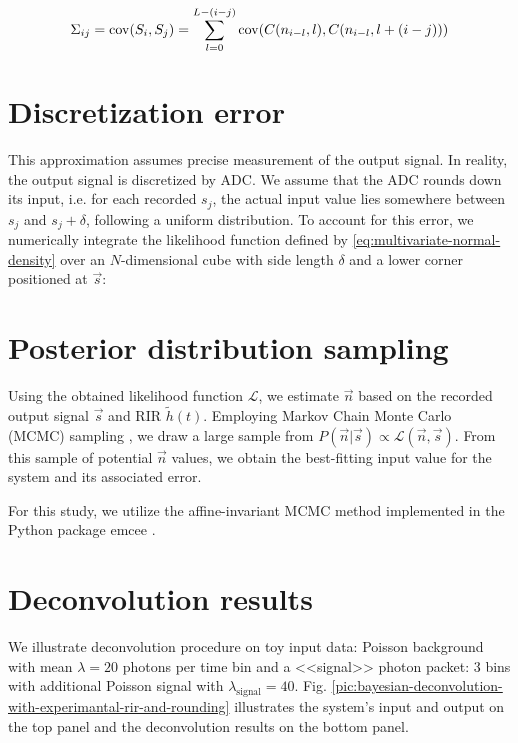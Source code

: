 \begin{equation}
	\Sigma_{ij} = \mathrm{cov}(S_i, S_j) = \sum_{l=0}^{L - (i-j)} \mathrm{cov}(C(n_{i-l}, l), C(n_{i-l}, l + (i-j)))
\end{equation}


\section{Discretization error}

This approximation assumes precise measurement of the output signal. In reality, the output signal is discretized by ADC. We assume that the ADC rounds down its input, i.e. for each recorded $s_j$, the actual input value lies somewhere between $s_j$ and $s_j + \delta$, following a uniform distribution. To account for this error, we numerically integrate the likelihood function defined by \ref{eq:multivariate-normal-density} over an $N$-dimensional cube with side length $\delta$ and a lower corner positioned at $\vec{s}$:


\section{Posterior distribution sampling}
\label{sec:mcmc-sampling}

Using the obtained likelihood function $\mathcal{L}$, we estimate $\vec{n}$ based on the recorded output signal $\vec{s}$ and RIR $\tilde{h}(t)$. Employing Markov Chain Monte Carlo (MCMC) sampling \cite{Sharma2017}, we draw a large sample from $P(\vec{n} | \vec{s}) \propto \mathcal{L}(\vec{n}, \vec{s})$. From this sample of potential $\vec{n}$ values, we obtain the best-fitting input value for the system and its associated error.

For this study, we utilize the affine-invariant MCMC method \cite{Goodman2010} implemented in the Python package emcee \cite{ForemanMackey2016}.

\section{Deconvolution results}

We illustrate deconvolution procedure on toy input data: Poisson background with mean $\lambda=20$ photons per time bin and a <<signal>> photon packet: 3 bins with additional Poisson signal with $\lambda_{\mathrm{signal}}=40$. Fig. \ref{pic:bayesian-deconvolution-with-experimantal-rir-and-rounding} illustrates the system's input and output on the top panel and the deconvolution results on the bottom panel.


